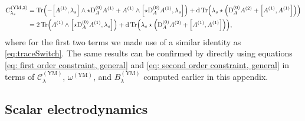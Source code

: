 \documentclass[]{jkpaper}
\theoremstyle{plain}
\theoremstyle{definition}
\newcommand{\DD}[1]{\text{D}_A#1}
\begin{document}
\begin{equation}
\begin{split}
    C_{\lambda_s}^{(\text{YM},2)} 
    &= \Tr(-\comm{A^{(1)}}{\lambda_s}  \wedge \star \DD^{(0)} A^{(1)} + A^{(1)} \wedge \comm{\star \DD^{(0)} A^{(1)}}{\lambda_s} ) 
    + \dd \Tr( \lambda_s\star \left(\DD^{(0)} A^{(2)} + \comm{A^{(1)}}{A^{(1)}} \right)) \\
    &= 2\Tr(A^{(1)} \wedge \comm{\star \DD^{(0)} A^{(1)}}{\lambda_s} ) 
    + \dd \Tr( \lambda_s \star \left(\DD^{(0)} A^{(2)} + \comm{A^{(1)}}{A^{(1)}} \right)),
\end{split}
\end{equation}
where for the first two terms we made use of a similar identity as \eqref{eq:traceSwitch}.
The same results can be confirmed by directly using equations \eqref{eq: first order constraint, general} and \eqref{eq: second order constraint, general} in terms of $\mathcal{C}_\lambda^{(\text{YM})}$,  $\omega^{(\text{YM})}$, and $B_\lambda^{(\text{YM})}$ computed earlier in this appendix.

\subsection{Scalar electrodynamics}
\label{app:sED}
\end{document}
